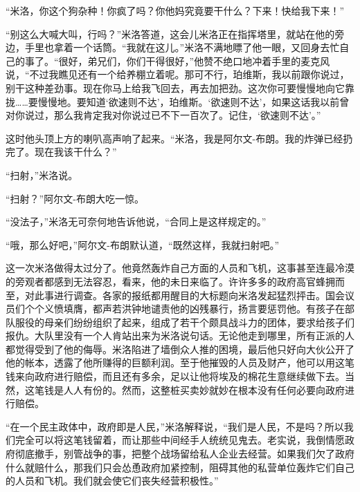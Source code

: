     “米洛，你这个狗杂种！你疯了吗？你他妈究竟要干什么？下来！快给我下来！”

    “别这么大喊大叫，行吗？”米洛答道，这会儿米洛正在指挥塔里，就站在他的旁边，手里也拿着一个话筒。“我就在这儿。”米洛不满地瞟了他一眼，又回身去忙自己的事了。“很好，弟兄们，你们干得很好，”他赞不绝口地冲着手里的麦克风说，“不过我瞧见还有一个给养棚立着呢。那可不行，珀维斯，我以前跟你说过，别干这种差劲事。现在你马上给我飞回去，再去加把劲。这次你可要慢慢地向它靠拢……要慢慢地。要知道‘欲速则不达’，珀维斯。‘欲速则不达’，如果这话我以前曾对你说过，那么我肯定我对你说过已不下一百次了。记住，‘欲速则不达’。”

    这时他头顶上方的喇叭高声响了起来。“米洛，我是阿尔文-布朗。我的炸弹已经扔完了。现在我该干什么？”

    “扫射，”米洛说。

    “扫射？”阿尔文-布朗大吃一惊。

    “没法子，”米洛无可奈何地告诉他说，“合同上是这样规定的。”

    “哦，那么好吧，”阿尔文-布朗默认道，“既然这样，我就扫射吧。”

    这一次米洛做得太过分了。他竟然轰炸自己方面的人员和飞机，这事甚至连最冷漠的旁观者都感到无法容忍，看来，他的未日来临了。许许多多的政府高官蜂拥而至，对此事进行调查。各家的报纸都用醒目的大标题向米洛发起猛烈抨击。国会议员们个个义愤填膺，都声若洪钟地谴责他的凶残暴行，扬言要惩罚他。有孩子在部队服役的母亲们纷纷组织了起来，组成了若干个颇具战斗力的团体，要求给孩子们报仇。大队里没有一个人肯站出来为米洛说句话。无论他走到哪里，所有正派的人都觉得受到了他的侮辱。米洛陷进了墙倒众人推的困境，最后他只好向大伙公开了他的帐本，透露了他所赚得的巨额利润。至于他摧毁的人员及财产，他可以用这笔钱来向政府进行赔偿，而且还有多余，足以让他将埃及的棉花生意继续做下去。当然，这笔钱是人人有份的。然而，这整桩买卖妙就妙在根本没有任何必要向政府进行赔偿。

    “在一个民主政体中，政府即是人民，”米洛解释说，“我们是人民，不是吗？所以我们完全可以将这笔钱留着，而让那些中间经手人统统见鬼去。老实说，我倒情愿政府彻底撤手，别管战争的事，把整个战场留给私人企业去经营。如果我们欠了政府什么就赔什么，那我们只会怂恿政府加紧控制，阻碍其他的私营单位轰炸它们自己的人员和飞机。我们就会使它们丧失经营积极性。”
 


